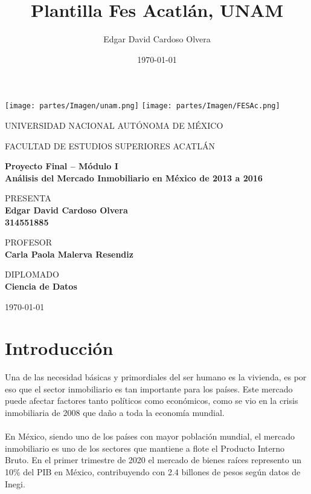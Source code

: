 \documentclass{report}
\title{Plantilla Fes Acatlán, UNAM}
\author{Edgar David Cardoso Olvera}
\date{\today}
\begin{document}
	
	\texttt{[image: partes/Imagen/unam.png]}
	\texttt{[image: partes/Imagen/FESAc.png]}
	
	\begin{center}
	\vspace{0.8cm}
	\LARGE
	UNIVERSIDAD NACIONAL AUTÓNOMA DE MÉXICO 
	
	\vspace{0.8cm}
	\LARGE
	FACULTAD DE ESTUDIOS SUPERIORES ACATLÁN
	
	\vspace{1.7cm}	
	\Large
	\textbf{Proyecto Final – Módulo I\\ Análisis del Mercado Inmobiliario en México de 2013 a 2016}
	

	\vspace{1.3cm}
	\normalsize	
	PRESENTA \\
	\vspace{.3cm}
	\large
	\textbf{Edgar David Cardoso Olvera \\ 314551885}
	
	\vspace{1.3cm}
	\normalsize	
	PROFESOR \\
	\vspace{.3cm}
	\large
	\textbf{Carla Paola Malerva Resendiz}
	
	\vspace{1.3cm}
	\normalsize	
	DIPLOMADO \\
	\vspace{.3cm}
	\large
	\textbf{Ciencia de Datos}
	
	\vspace{1.3cm}
	\today
	\end{center}
	
\tableofcontents
    \chapter{Introducción}
    Una de las necesidad básicas y primordiales del ser humano es la vivienda, es por eso que el sector inmobiliario es tan importante para los países. Este mercado puede afectar factores tanto políticos como económicos, como se vio en la crisis inmobiliaria de 2008 que daño a toda la economía mundial.\\ \\
    En México, siendo uno de los países con mayor población mundial, el mercado inmobiliario es uno de los sectores que mantiene a flote el Producto Interno Bruto. En el primer trimestre de 2020 el mercado de bienes raíces represento un 10\% del PIB en México, contribuyendo con 2.4 billones de pesos según datos de Inegi.
\end{document}
